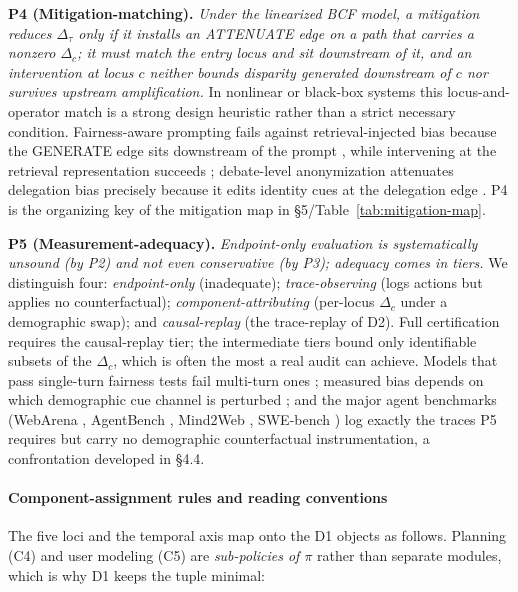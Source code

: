 \documentclass[acmsmall,nonacm]{acmart}
\begin{document}
\textbf{P4 (Mitigation-matching).} \emph{Under the linearized BCF model, a mitigation reduces $\Delta_\tau$ only if it installs an ATTENUATE edge on a path that carries a nonzero $\Delta_c$; it must match the entry locus and sit downstream of it, and an intervention at locus $c$ neither bounds disparity generated downstream of $c$ nor survives upstream amplification.} In nonlinear or black-box systems this locus-and-operator match is a strong design heuristic rather than a strict necessary condition. Fairness-aware prompting fails against retrieval-injected bias because the GENERATE edge sits downstream of the prompt \cite{hu2024free}, while intervening at the retrieval representation succeeds \cite{kim2025mitigating}; debate-level anonymization attenuates delegation bias precisely because it edits identity cues at the delegation edge \cite{choi2025identity}. P4 is the organizing key of the mitigation map in \S{}5/Table~\ref{tab:mitigation-map}.

\textbf{P5 (Measurement-adequacy).} \emph{Endpoint-only evaluation is systematically unsound (by P2) and not even conservative (by P3); adequacy comes in tiers.} We distinguish four: \emph{endpoint-only} (inadequate); \emph{trace-observing} (logs actions but applies no counterfactual); \emph{component-attributing} (per-locus $\Delta_c$ under a demographic swap); and \emph{causal-replay} (the trace-replay of D2). Full certification requires the causal-replay tier; the intermediate tiers bound only identifiable subsets of the $\Delta_c$, which is often the most a real audit can achieve. Models that pass single-turn fairness tests fail multi-turn ones \cite{fan2024fairmt}; measured bias depends on which demographic cue channel is perturbed \cite{tonneau2026different}; and the major agent benchmarks (WebArena \cite{zhou2024webarena}, AgentBench \cite{liu2024agentbench}, Mind2Web \cite{deng2023mind2web}, SWE-bench \cite{jimenez2024swe}) log exactly the traces P5 requires but carry no demographic counterfactual instrumentation, a confrontation developed in \S{}4.4.

\paragraph{Component-assignment rules and reading conventions}

The five loci and the temporal axis map onto the D1 objects as follows. Planning (C4) and user modeling (C5) are \emph{sub-policies of $\pi$} rather than separate modules, which is why D1 keeps the tuple minimal:
\end{document}
